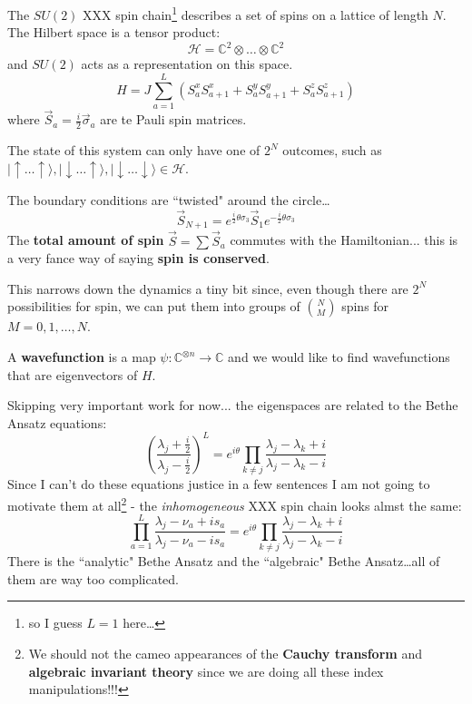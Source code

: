 \documentclass[12pt]{article}
\begin{document}
\noindent The $SU(2)$ XXX spin chain\footnote{so I guess $L=1$ here\dots} describes a set of spins on a lattice of length $N$.  The Hilbert space is a tensor product:
$$ \mathcal{H} = \mathbb{C}^2 \otimes \dots \otimes \mathbb{C}^2$$
and $SU(2)$ acts as a representation on this space.
$$ H = J \sum_{a=1}^L (S_a^x S_{a+1}^x + 
S_a^y S_{a+1}^y + 
S_a^z S_{a+1}^z )$$
where $\vec{S}_a = \frac{i}{2}\vec{\sigma}_a$ are te Pauli spin matrices.


\newpage

\noindent The state of this system can only have one of $2^N$ outcomes, such as $| \uparrow \dots \uparrow \rangle, | \downarrow \dots \uparrow \rangle, | \downarrow \dots \downarrow \rangle \in \mathcal{H}$. \newline

\noindent The boundary conditions are ``twisted" around the circle\dots
$$ \vec{S}_{N+1} = e^{\frac{i}{2} \theta \sigma_3} \vec{S}_{1} e^{-\frac{i}{2} \theta \sigma_3}$$
The \textbf{total amount of spin} $\vec{S} = \sum \vec{S}_a$ commutes with the Hamiltonian... this is a very fance way of saying \textbf{spin is conserved}. \newline

\noindent This narrows down the dynamics a tiny bit since, even though there are $2^N$ possibilities for spin, we can put them into groups of $\binom{N}{M}$ spins for $M = 0, 1, \dots, N$.  \newline

\noindent A \textbf{wavefunction} is a map $\psi: \mathbb{C}^{\otimes n} \to \mathbb{C}$ and we would like to find wavefunctions that are eigenvectors of $H$.

\newpage

\noindent Skipping very important work for now... the eigenspaces are related to the Bethe Ansatz equations:
$$ \left( \frac{\lambda_j + \frac{i}{2}}{\lambda_j - \frac{i}{2}}\right)^L = e^{i\theta} \prod_{k \neq j} \frac{\lambda_j - \lambda_k + i}{\lambda_j - \lambda_k - i} $$
Since I can't do these equations justice in a few sentences I am not going to motivate them at all\footnote{We should not the cameo appearances of the \textbf{Cauchy transform} and \textbf{algebraic invariant theory} since we are doing all these index manipulations!!!} - the \textit{inhomogeneous} XXX spin chain looks almst the same:
$$ \prod_{a=1}^L
\frac{\lambda_j - \nu_a + is_a}{\lambda_j   - \nu_a - is_a} = e^{i \theta}\prod_{k \neq j} \frac{\lambda_j - \lambda_k + i}{\lambda_j - \lambda_k - i}  $$
There is the ``analytic" Bethe Ansatz and the ``algebraic" Bethe Ansatz\dots all of them are way too complicated.
\end{document}
